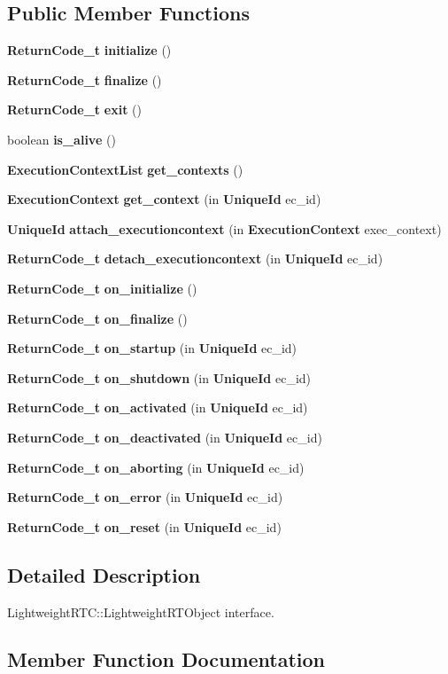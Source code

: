 \subsection*{Public Member Functions}
\begin{CompactItemize}
\item 
{\bf Return\-Code\_\-t} {\bf initialize} ()
\item 
{\bf Return\-Code\_\-t} {\bf finalize} ()
\item 
{\bf Return\-Code\_\-t} {\bf exit} ()
\item 
boolean {\bf is\_\-alive} ()
\item 
{\bf Execution\-Context\-List} {\bf get\_\-contexts} ()
\item 
{\bf Execution\-Context} {\bf get\_\-context} (in {\bf Unique\-Id} ec\_\-id)
\item 
{\bf Unique\-Id} {\bf attach\_\-executioncontext} (in {\bf Execution\-Context} exec\_\-context)
\item 
{\bf Return\-Code\_\-t} {\bf detach\_\-executioncontext} (in {\bf Unique\-Id} ec\_\-id)
\item 
{\bf Return\-Code\_\-t} {\bf on\_\-initialize} ()
\item 
{\bf Return\-Code\_\-t} {\bf on\_\-finalize} ()
\item 
{\bf Return\-Code\_\-t} {\bf on\_\-startup} (in {\bf Unique\-Id} ec\_\-id)
\item 
{\bf Return\-Code\_\-t} {\bf on\_\-shutdown} (in {\bf Unique\-Id} ec\_\-id)
\item 
{\bf Return\-Code\_\-t} {\bf on\_\-activated} (in {\bf Unique\-Id} ec\_\-id)
\item 
{\bf Return\-Code\_\-t} {\bf on\_\-deactivated} (in {\bf Unique\-Id} ec\_\-id)
\item 
{\bf Return\-Code\_\-t} {\bf on\_\-aborting} (in {\bf Unique\-Id} ec\_\-id)
\item 
{\bf Return\-Code\_\-t} {\bf on\_\-error} (in {\bf Unique\-Id} ec\_\-id)
\item 
{\bf Return\-Code\_\-t} {\bf on\_\-reset} (in {\bf Unique\-Id} ec\_\-id)
\end{CompactItemize}


\subsection{Detailed Description}
Lightweight\-RTC::Lightweight\-RTObject interface. 



\subsection{Member Function Documentation}
